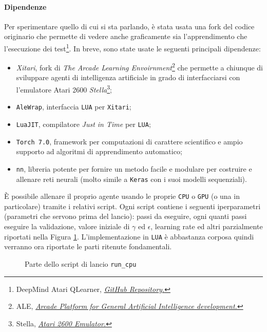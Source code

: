 \documentclass[twoside,twocolumn,10pt]{extarticle}
\theoremstyle{definition}
\begin{document}
		\paragraph*{Dipendenze} Per sperimentare quello di cui si sta parlando, è stata usata una fork del codice originario che permette di vedere anche graficamente sia l'apprendimento che l'esecuzione dei test\footnote{DeepMind Atari Q\texttwelveudash Learner, \emph{\href{https://github.com/kuz/DeepMind-Atari-Deep-Q-Learner}{GitHub Repository.}}}. In breve, sono state usate le seguenti principali dipendenze:
		\begin{itemize}
			\item \textit{Xitari}, fork di \textit{The Arcade Learning Envoirnment}\footnote{ALE, \emph{\href{http://www.arcadelearningenvironment.org/}{Arcade Platform for General Artificial Intelligence development.}}} che permette a chiunque di sviluppare agenti di intelligenza artificiale in grado di interfacciarsi con l'emulatore Atari 2600 \textit{Stella}\footnote{Stella, \emph{\href{https://github.com/stella-emu/stella}{Atari 2600 Emulator.}}};
			\item \texttt{AleWrap}, interfaccia \texttt{LUA} per \texttt{Xitari};
			\item \texttt{LuaJIT}, compilatore \textit{Just in Time} per \texttt{LUA};
			\item \texttt{Torch 7.0}, framework per computazioni di carattere scientifico e ampio supporto ad algoritmi di apprendimento automatico;
			\item \texttt{nn}, libreria potente per fornire un metodo facile e modulare per costruire e allenare reti neurali (molto simile a \texttt{Keras} con i suoi modelli sequenziali).
		\end{itemize}
	
		È possibile allenare il proprio agente usando le proprie \texttt{CPU} o \texttt{GPU} (o una in particolare) tramite i relativi script. Ogni script contiene i seguenti iperparametri (parametri che servono prima del lancio): passi da eseguire, ogni quanti passi eseguire la validazione, valore iniziale di $\gamma$ ed $\epsilon$, learning rate ed altri parzialmente riportati nella Figura \ref{code:run}. L'implementazione in \texttt{LUA} è abbastanza corposa quindi verranno ora riportate le parti ritenute fondamentali.
		\begin{figure}[ht!]
			\centering
			\caption{Parte dello script di lancio \texttt{run\_cpu}}
			
			\label{code:run}
		\end{figure}
	
\end{document}
